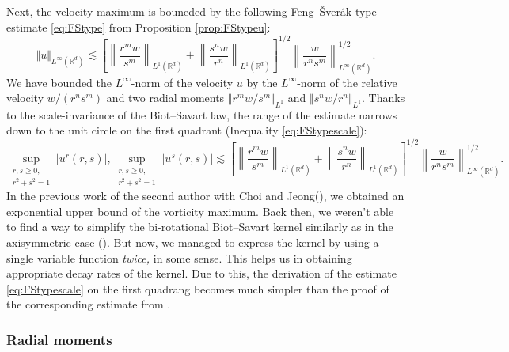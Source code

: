 \documentclass[11pt]{amsart}
\theoremstyle{definition}
\theoremstyle{remark}
\numberwithin{equation}{section}
\numberwithin{equation}{section}
\newcommand{\nrm}[1]{\Vert#1\Vert}
\newcommand{\0}{\emptyset}
\newcommand{\ift}{\infty}
\newcommand{\bbR}{\mathbb R}
\begin{document}
	Next, the velocity maximum is bouneded by the following Feng--\v{S}ver\'{a}k-type estimate \eqref{eq:FStype} from Proposition \ref{prop:FStypeu}:
	\begin{equation}
		\nrm{u}_{L^{\ift}(\bbR^{d})}\lesssim \left[\left\| \frac{r^{m}w}{s^{m}}\right\|_{L^{1}(\bbR^{d})}+\left\| \frac{s^{n}w}{r^{n}}\right\|_{L^{1}(\bbR^{d})}\right]^{1/2}\left\| \frac{w}{r^{n}s^{m}}\right\|_{L^{\ift}(\bbR^{d})}^{1/2}.
	\end{equation}
	We have bounded the $L^{\ift}$-norm of the velocity $u $ by the $L^{\ift}$-norm of the relative velocity $w/(r^{n}s^{m})$ and two radial moments $\nrm{r^{m}w/s^{m}}_{L^{1}}$ and $\nrm{s^{n}w/r^{n}}_{L^{1}}$. 
	Thanks to the scale-invariance of the Biot--Savart law, the range of the estimate narrows down to the unit circle on the first quadrant (Inequality \eqref{eq:FStypescale}):
	\begin{equation}
		\sup_{\substack{r,s\geq0,\\r^{2}+s^{2}=1}}|u^{r}(r,s)|, \sup_{\substack{r,s\geq0,\\r^{2}+s^{2}=1}}|u^{s}(r,s)|\lesssim \left[\left\| \frac{r^{m}w}{s^{m}}\right\|_{L^{1}(\bbR^{d})}+\left\| \frac{s^{n}w}{r^{n}}\right\|_{L^{1}(\bbR^{d})}\right]^{1/2}\left\| \frac{w}{r^{n}s^{m}}\right\|_{L^{\ift}(\bbR^{d})}^{1/2}.
	\end{equation}
	In the previous work of the second author with Choi and Jeong(\cite{CJL_gwpbi}), we obtained an exponential upper bound of the vorticity maximum. Back then, we weren't able to find a way to simplify the bi-rotational Biot--Savart kernel similarly as in the axisymmetric case (\cite{FeSv}). But now, we managed to express the kernel by using a single variable function \textit{twice,} in some sense. This helps us in obtaining appropriate decay rates of the kernel. Due to this, the derivation of the estimate \eqref{eq:FStypescale} on the first quadrang becomes much simpler than the proof of the corresponding estimate from \cite{CJL_gwpbi}.
	
	\subsubsection{Radial moments}
	
\end{document}
